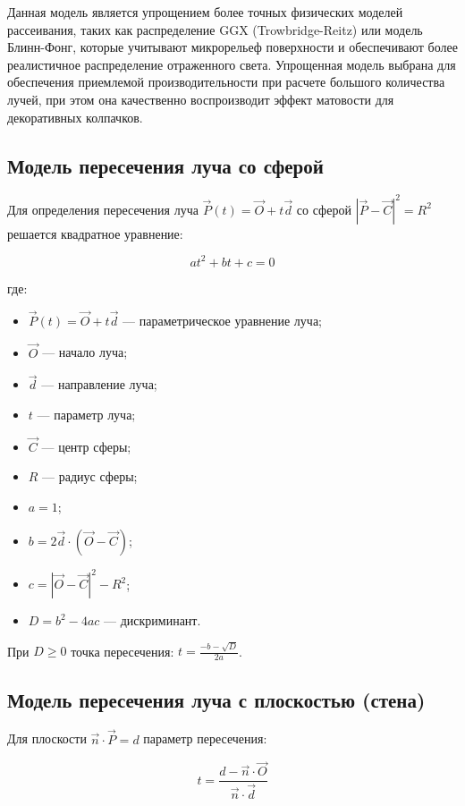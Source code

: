 Данная модель является упрощением более точных физических моделей рассеивания, таких как распределение GGX (Trowbridge-Reitz) или модель Блинн-Фонг, которые учитывают микрорельеф поверхности и обеспечивают более реалистичное распределение отраженного света. Упрощенная модель выбрана для обеспечения приемлемой производительности при расчете большого количества лучей, при этом она качественно воспроизводит эффект матовости для декоративных колпачков.

\subsection{Модель пересечения луча со сферой}

Для определения пересечения луча $\vec{P}(t) = \vec{O} + t \vec{d}$ со сферой $|\vec{P} - \vec{C}|^2 = R^2$ решается квадратное уравнение:

\begin{equation}
at^2 + bt + c = 0
\end{equation}

где:
\begin{itemize}
    \item $\vec{P}(t) = \vec{O} + t \vec{d}$ --- параметрическое уравнение луча;
    \item $\vec{O}$ --- начало луча;
    \item $\vec{d}$ --- направление луча;
    \item $t$ --- параметр луча;
    \item $\vec{C}$ --- центр сферы;
    \item $R$ --- радиус сферы;
    \item $a = 1$;
    \item $b = 2 \vec{d} \cdot (\vec{O} - \vec{C})$;
    \item $c = |\vec{O} - \vec{C}|^2 - R^2$;
    \item $D = b^2 - 4ac$ --- дискриминант.
\end{itemize}

При $D \geq 0$ точка пересечения: $t = \frac{-b - \sqrt{D}}{2a}$.

\subsection{Модель пересечения луча с плоскостью (стена)}

Для плоскости $\vec{n} \cdot \vec{P} = d$ параметр пересечения:

\begin{equation}
t = \frac{d - \vec{n} \cdot \vec{O}}{\vec{n} \cdot \vec{d}}
\end{equation}

